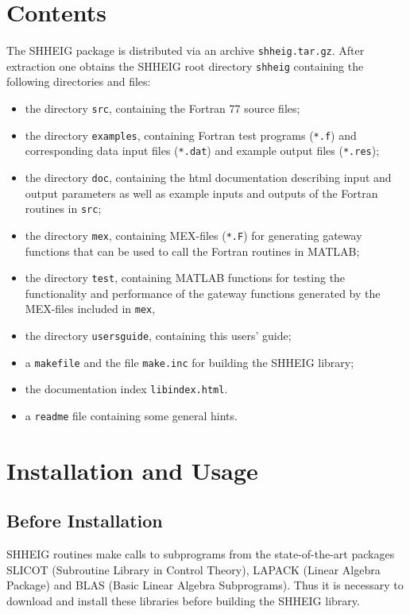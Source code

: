 \documentclass[a4paper,10pt]{article}
\begin{document}
\section{Contents}
The SHHEIG package is distributed via an archive \texttt{shheig.tar.gz}. After extraction one obtains the SHHEIG root directory \texttt{shheig}
containing the following directories and files:
\begin{itemize}
 \item the directory \texttt{src}, containing the Fortran 77 source files;
 \item the directory \texttt{examples}, containing Fortran test programs (\texttt{*.f}) and corresponding data input files (\texttt{*.dat}) and example output files (\texttt{*.res});
 \item the directory \texttt{doc}, containing the html documentation describing input and output parameters as well as example inputs and outputs of the Fortran routines in \texttt{src};
 \item the directory \texttt{mex}, containing MEX-files (\texttt{*.F}) for generating gateway functions that can be used to call the Fortran routines in MATLAB;
 \item the directory \texttt{test}, containing MATLAB functions for testing the functionality and performance of the gateway functions generated by the MEX-files included in \texttt{mex},
 \item the directory \texttt{usersguide}, containing this users' guide;
 \item a \texttt{makefile} and the file \texttt{make.inc} for building the SHHEIG library;
 \item the documentation index \texttt{libindex.html}.
 \item a \texttt{readme} file containing some general hints.
\end{itemize}
%
\section{Installation and Usage}
%
\subsection{Before Installation}
%
SHHEIG routines make calls to subprograms from the state-of-the-art packages SLICOT (Subroutine Library in Control Theory), LAPACK (Linear 
Algebra Package) and BLAS (Basic Linear Algebra Subprograms). Thus it is necessary to download and install these libraries before building the SHHEIG library.
\end{document}
